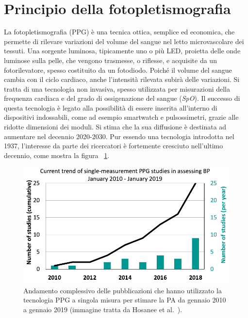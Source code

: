 \section{Principio della fotopletismografia}
La fotopletismografia (PPG) è una tecnica ottica, semplice ed economica, che permette di rilevare variazioni del volume del sangue nel letto microvascolare dei tessuti\cite{Dey2019}. Una sorgente luminosa, tipicamente uno o più LED, proietta delle onde luminose sulla pelle, che vengono trasmesse, o riflesse, e acquisite da un fotorilevatore, spesso costituito da un fotodiodo. Poiché il volume del sangue cambia con il ciclo cardiaco, anche l'intensità rilevata subirà delle variazioni. Si tratta di una tecnologia non invasiva, spesso utilizzata per misurazioni della frequenza cardiaca e del grado di ossigenazione del sangue (\textit{SpO}). Il successo di questa tecnologia è legato alla possibilità di essere inserita all'interno di dispositivi indossabili, come ad esempio smartwatch e pulsossimetri, grazie alle ridotte dimensioni dei moduli. Si stima che la sua diffusione è destinata ad aumentare nel decennio 2020-2030. Pur essendo una tecnologia introdotta nel 1937, l'interesse da parte dei ricercatori è fortemente cresciuto nell'ultimo decennio, come mostra la figura \Fig~\ref{fig:TrendStudies}.
\begin{figure}[tb]
	\centering
	\includegraphics[width=0.7\linewidth]{ImageFiles/Fotopletismografia/TrendStudies}
	\caption{Andamento complessivo delle pubblicazioni che hanno utilizzato la tecnologia PPG a singola misura per stimare la PA da gennaio 2010 a gennaio 2019 (immagine tratta da Hosanee et al.~\cite{Hosanee2020}).}
	\label{fig:TrendStudies}
\end{figure}
